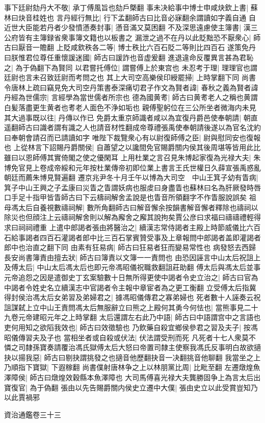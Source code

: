 事下廷尉劾丹大不敬|{
	承丁傅風旨也劾戶槩翻}
事未决給事中博士申咸炔欽上書|{
	蘇林曰炔音桂姓也}
言丹經行無比|{
	行下孟翻師古曰比音必寐翻余謂讀如字義自通}
自近世大臣能若丹者少發憤懣奏封事|{
	懣音滿又莫困翻}
不及深思遠慮使主簿書|{
	漢三公府皆有主簿録省衆事簿文籍也以板書之}
漏泄之過不在丹以此貶黜恐不厭衆心|{
	師古曰厭音一贍翻}
上貶咸欽秩各二等|{
	博士秩比六百石貶二等則比四百石}
遂策免丹曰朕惟君位尊任重懷諼迷國|{
	師古曰諼詐也音虚爰翻}
進退違命反覆異言甚為君恥之|{
	為于偽翻下為賢同}
以君嘗托傅位|{
	謂嘗傅上於東宫也}
未忍考于理|{
	理理官也謂廷尉也言未召致廷尉而考問之也}
其上大司空高樂侯印綬罷掃|{
	上時掌翻下同}
尚書令唐林上疏曰竊見免大司空丹策書泰深痛切君子作文為賢者諱|{
	春秋之義為賢者諱}
丹經為世儒宗|{
	言經學為當世儒者所宗也}
德為國黄耉|{
	師古曰黄耉老人之稱也黄謂白髪落盡更生黄者也耉老人面色不浄如垢也}
親傅聖躬位在三公所坐者微海内未見其大過事既以往|{
	丹傳以作已}
免爵太重京師識者咸以為宜復丹爵邑使奉朝請|{
	朝直遥翻師古曰識者謂有識之人也請音材性翻成帝尊禮張禹使奉朝請後遂以為官名沈約曰奉朝會請召而已請讀如字}
唯陛下裁覽衆心有以尉復師傅之臣|{
	尉與慰同安也復報也}
上從林言下詔賜丹爵關侯|{
	自蕭望之以讒間免官賜爵關内侯其後周堪等皆用此比雖曰以恩師傅其實倚閣之使之優閑耳}
上用杜業之言召見朱博起家復為光禄大夫|{
	朱博免官見上卷成帝綏和元年按杜業傳帝初即位業上書言王氏世權日久薛宣張禹惑亂朝廷而薦朱博見賢遍翻}
遷京兆尹冬十月壬午以博為大司空　中山王箕子幼有眚病|{
	箕子中山王興之子孟康曰災眚之眚謂妖病也服䖍曰身盡眚也蘇林曰名為肝厥發時唇口手足十指甲皆眚師古曰下云檮祠解舍孟說是也眚音所領翻字不作眚服說誤矣}
祖母馮太后自養視數禱祠解|{
	數所角翻師古曰解音懈余按韻書解音懈者釋除也禱祠以除災也但顔注上云禱祠解舍則以解為廨舍之廨其說拘矣賈公彦曰求福曰禱禱禮輕得求曰祠祠禮重}
上遣中郎謁者張由將醫治之|{
	續漢志常侍謁者主殿上時節威儀比六百石給事謁者四百石灌謁者郎中比三百石掌賓贊受事及上章報問中郎謁者盖即灌謁者郎中也治直之翻下同}
由素有狂易病|{
	師古曰狂易者狂而變易常性也}
病發怒去西歸長安尚書簿責由擅去狀|{
	師古曰簿責以文簿一一責問也}
由恐因誣言中山太后祝詛上及傅太后|{
	中山太后馮太后也即元帝馮昭儀祝職救翻詛莊助翻}
傅太后與馮太后並事元帝追怨之因是遣御史丁玄案驗數十日無所得更使中謁者令史立治之|{
	師古曰官為中謁者令姓史名立續漢志中官謁者令主報中章宦者為之更工衡翻}
立受傅太后指冀得封侯治馮太后女弟習及弟婦君之|{
	據馮昭儀傳君之寡弟婦也}
死者數十人誣奏云祝詛謀弑上立中山王責問馮太后無服辭立曰熊之上殿何其勇今何怯也|{
	當熊事見二十九卷元帝建昭元年之上時掌翻}
太后還謂左右此乃中語|{
	師古曰中語謂宫中之言語也}
吏何用知之欲䧟我效也|{
	師古曰效徵驗也}
乃飲藥自殺宜鄉侯參君之習及夫子|{
	按馮昭儀傳習夫及子也}
當相坐者或自殺或伏法|{
	伏法謂受刑而死}
凡死者十七人衆莫不憐之司隸孫寶奏請覆治馮氏獄傅太后大怒曰帝置司隸主使察我馮氏反事明白故欲擿抉以揚我惡|{
	師古曰剔抉謂挑發之也擿音他歷翻抉音一决翻挑音他聊翻}
我當坐之上乃順指下寶獄|{
	下遐稼翻}
尚書僕射唐林争之上以林朋黨比周|{
	比毗至翻}
左遷燉煌魚澤障侯|{
	師古曰燉煌效穀縣本魚澤障也}
大司馬傅喜光禄大夫龔勝固争上為言太后出寶復官|{
	為于偽翻}
張由以先告賜爵關内侯史立遷中大僕|{
	張由史立以此受賞豈知乃以此賈禍邪}


資治通鑑卷三十三
